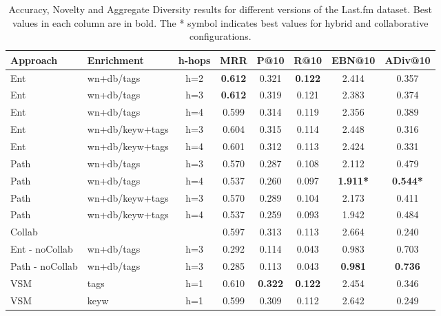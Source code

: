 \begin{table}
	\label{tbl:graph-rec:Res_sf}
	\begin{tabular}{l l c c c c c c }
		\toprule
		\textbf{Approach} & \textbf{Enrichment} & \textbf{h-hops} &  \textbf{MRR} &  \textbf{P@10} & \textbf{R@10} & \textbf{EBN@10}  & \textbf{ADiv@10}\\
		\midrule
		Ent & wn+db/tags & h=2 & \textbf{0.612} & 0.321 & \textbf{0.122} & 2.414 & 0.357 \\
		Ent & wn+db/tags & h=3 & \textbf{0.612} & 0.319 & 0.121 & 2.383 & 0.374 \\
		Ent & wn+db/tags & h=4 & 0.599 & 0.314 & 0.119 & 2.356 & 0.389 \\
		Ent & wn+db/keyw+tags & h=3 & 0.604 & 0.315 & 0.114 & 2.448 & 0.316 \\
		Ent & wn+db/keyw+tags & h=4 & 0.601 & 0.312 & 0.113 & 2.424 & 0.331 \\
		Path & wn+db/tags & h=3 & 0.570 & 0.287 & 0.108 & 2.112 & 0.479 \\
		Path & wn+db/tags & h=4 & 0.537 & 0.260 & 0.097 & \textbf{1.911*} & \textbf{0.544*} \\
		Path & wn+db/keyw+tags & h=3 & 0.570 & 0.289 & 0.104 & 2.173 & 0.411 \\
		Path & wn+db/keyw+tags & h=4 & 0.537 & 0.259 & 0.093 & 1.942 & 0.484 \\
		\midrule
		Collab & & & 0.597 & 0.313 & 0.113 & 2.664 & 0.240 \\	
		Ent - noCollab & wn+db/tags & h=3 & 0.292 & 0.114 & 0.043 & 0.983 & 0.703 \\
		Path - noCollab & wn+db/tags & h=3 &0.285  & 0.113 & 0.043 & \textbf{0.981} & \textbf{0.736} \\
		VSM & tags & h=1 & 0.610 & \textbf{0.322} & \textbf{0.122} & 2.454 & 0.346 \\
		VSM & keyw & h=1 & 0.599 & 0.309 & 0.112 & 2.642 & 0.249 \\
		\bottomrule		
	\end{tabular}
	\caption{Accuracy, Novelty and Aggregate Diversity results for different versions of the Last.fm dataset. Best values in each column are in bold. The * symbol indicates best values for hybrid and collaborative configurations. 
	}
\end{table}


